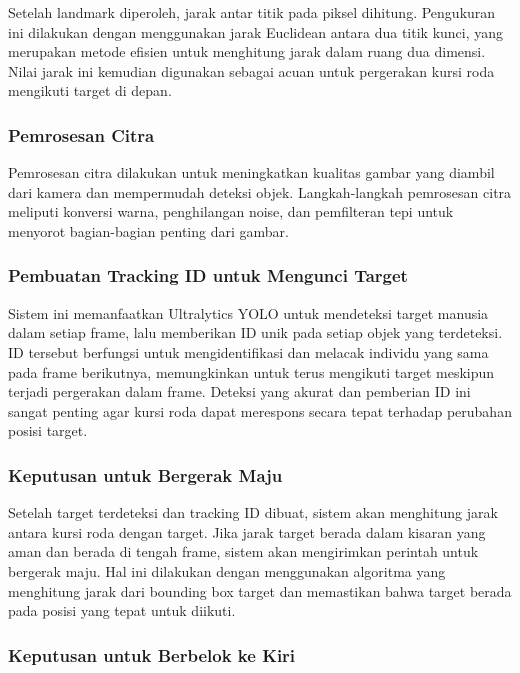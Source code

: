 Setelah landmark diperoleh, jarak antar titik pada piksel dihitung. Pengukuran ini dilakukan dengan menggunakan jarak Euclidean antara dua titik kunci, yang merupakan metode efisien untuk menghitung jarak dalam ruang dua dimensi. Nilai jarak ini kemudian digunakan sebagai acuan untuk pergerakan kursi roda mengikuti target di depan.

\subsubsection{Pemrosesan Citra}
\label{subsubsec:pemrosesan_citra}

Pemrosesan citra dilakukan untuk meningkatkan kualitas gambar yang diambil dari kamera dan mempermudah deteksi objek. Langkah-langkah pemrosesan citra meliputi konversi warna, penghilangan noise, dan pemfilteran tepi untuk menyorot bagian-bagian penting dari gambar.

\subsubsection*{Pembuatan Tracking ID untuk Mengunci Target}
\label{subsubsec:tracking_id}

Sistem ini memanfaatkan Ultralytics YOLO untuk mendeteksi target manusia dalam setiap frame, lalu memberikan ID unik pada setiap objek yang terdeteksi. ID tersebut berfungsi untuk mengidentifikasi dan melacak individu yang sama pada frame berikutnya, memungkinkan untuk terus mengikuti target meskipun terjadi pergerakan dalam frame. Deteksi yang akurat dan pemberian ID ini sangat penting agar kursi roda dapat merespons secara tepat terhadap perubahan posisi target.

\subsubsection*{Keputusan untuk Bergerak Maju}
\label{subsubsec:keputusan_bergerak_maju}

Setelah target terdeteksi dan tracking ID dibuat, sistem akan menghitung jarak antara kursi roda dengan target. Jika jarak target berada dalam kisaran yang aman dan berada di tengah frame, sistem akan mengirimkan perintah untuk bergerak maju. Hal ini dilakukan dengan menggunakan algoritma yang menghitung jarak dari bounding box target dan memastikan bahwa target berada pada posisi yang tepat untuk diikuti.

\subsubsection*{Keputusan untuk Berbelok ke Kiri}
\label{subsubsec:keputusan_belok_kiri}

